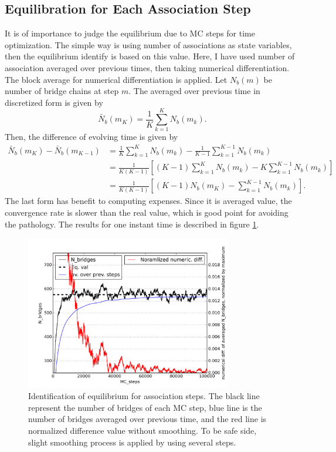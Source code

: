 \message{ !name(brief_Brownian_dynamics.tex)}\documentclass[10pt, a4paper]{report}
\begin{document}
\subsection{Equilibration for Each Association Step}
It is of importance to judge the equilibrium due to MC steps for time optimization. The simple way is using number of associations as state variables, then the equilibrium identify is based on this value. Here, I have used number of association averaged over previous times, then taking numerical differentiation. The block average for numerical differentiation is applied. Let $N_b(m)$ be number of bridge chains at step $m$. The averaged over previous time in discretized form is given by
\begin{equation}
\bar{N}_b(m_K) = \frac{1}{K}\sum_{k=1}^{K}N_b(m_k).
\end{equation}
Then, the difference of evolving time is given by
\begin{align}
\bar{N}_b(m_{K}) - \bar{N}_b(m_{K-1}) &= \frac{1}{K}\sum_{k=1}^{K}N_b(m_k) - \frac{1}{K-1}\sum_{k=1}^{K-1}N_b(m_k) \\
&= \frac{1}{K(K-1)}\left[(K-1)\sum_{k=1}^{K}N_b(m_k) - K\sum_{k=1}^{K-1}N_b(m_k)\right] \\
&= \frac{1}{K(K-1)}\left[(K-1)N_b(m_K) - \sum_{k=1}^{K-1}N_b(m_k)\right].
\end{align}
The last form has benefit to computing expenses. Since it is averaged value, the convergence rate is slower than the real value, which is good point for avoiding the pathology. The results for one instant time is described in figure \ref{fig:identification_equilibrium_MC}.

\begin{figure}
  \centering
  \includegraphics[width=0.8\textwidth]{figures/identify_equilibrium.png}
  \caption{Identification of equilibrium for association steps. The black line represent the number of bridges of each MC step, blue line is the number of bridges averaged over previous time, and the red line is normalized difference value without smoothing. To be safe side, slight smoothing process is applied by using several steps.}
  \label{fig:identification_equilibrium_MC}
\end{figure}
\end{document}
